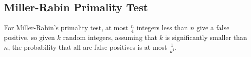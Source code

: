 \documentclass[12pt]{article}
\begin{document}
\subsection{Miller-Rabin Primality Test}
For Miller-Rabin's primality test, at most $\frac{n}{4}$ integers less than $n$ give a false positive, so given $k$ random integers, assuming that $k$ is significantly smaller than $n$, the probability that all are false positives is at most $\frac{1}{k^{4}}$. 
\end{document}
